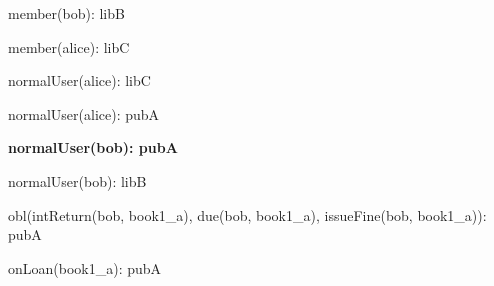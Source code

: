 \documentclass{article}
\begin{document}
{\begin{minipage}{\tableWidth}
\begin{description}[align=left,leftmargin=1em,noitemsep,labelsep=\parindent]
\item{{member(\allowbreak{}bob): libB}}
\item{{member(\allowbreak{}alice): libC}}
\item{{normalUser(\allowbreak{}alice): libC}}
\item{{normalUser(\allowbreak{}alice): pubA}}
\item\textbf{{normalUser(\allowbreak{}bob): pubA}}
\item{{normalUser(\allowbreak{}bob): libB}}
\item{{obl(\allowbreak{}intReturn(\allowbreak{}bob, book1\_a), due(\allowbreak{}bob, book1\_a), issueFine(\allowbreak{}bob, book1\_a)): pubA}}
\item{{onLoan(\allowbreak{}book1\_a): pubA}}
\end{description}\end{minipage}}
\end{document}
